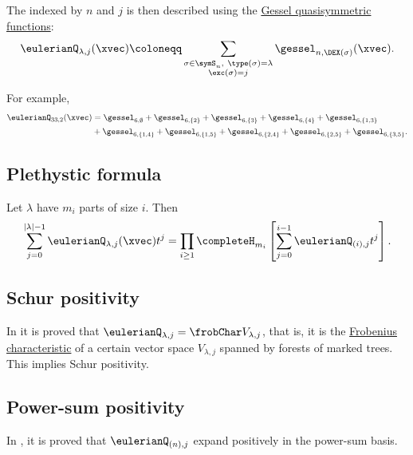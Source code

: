 The  indexed by $n$ and $j$ is then
described using the \hyperref[gessel]{Gessel quasisymmetric functions}:
\[
\eulerianQ_{\lambda,j}(\xvec) \coloneqq \sum_{\substack{\sigma \in \symS_n,\ \type(\sigma) = \lambda \\ \exc(\sigma)=j}} \gessel_{n,\DEX(\sigma)}(\xvec).
\]

\begin{example}
For example,
\begin{align*}
\eulerianQ_{33,2}(\xvec) &=
\gessel_{6,\emptyset} +
\gessel_{6,\{2\}} +
\gessel_{6,\{3\}} +
\gessel_{6,\{4\}} +
\gessel_{6,\{1,3\}}  \\
&+\gessel_{6,\{1,4\}} +
\gessel_{6,\{1,5\}} +
\gessel_{6,\{2,4\}} +
\gessel_{6,\{2,5\}} +
\gessel_{6,\{3,5\}}.
\end{align*}
\end{example}

\subsection[eulerianSymmetricPlethystic]{Plethystic formula}


\begin{theorem}
Let $\lambda$ have $m_i$ parts of size $i$.
Then
\[
\sum_{j=0}^{|\lambda|-1} \eulerianQ_{\lambda,j}(\xvec)t^j =
\prod_{i \geq 1} \completeH_{m_i}\left[ \sum_{j=0}^{i-1} \eulerianQ_{(i),j} t^j \right].
\]
\end{theorem}


\subsection[eulerianSymmetricSchurPositivity]{Schur positivity}

In \cite{HendersonWachs2012} it is proved that $\eulerianQ_{\lambda,j} = \frobChar V_{\lambda,j}$,
that is, it is the \hyperref[frobeniusCharacteristic]{Frobenius characteristic} of a
certain vector space $V_{\lambda,j}$ spanned by forests of marked trees.
This implies Schur positivity.

\subsection[eulerianSymmetricPowerSumPositivity]{Power-sum positivity}

In \cite{SaganShareshianWachs2011}, it is proved that $\eulerianQ_{(n),j}$ expand positively in the power-sum basis.

